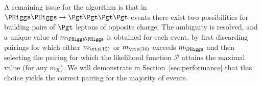 A remaining issue for the algorithm is that in $\PHiggs\PHiggs \to \Pgt\Pgt\Pgt\Pgt$ events 
there exist two possibilities for building pairs of $\Pgt$ leptons of opposite charge.
The ambiguity is resolved, and a unique value of $m_{\PHiggs\PHiggs}$ is obtained for each event, 
by first discarding pairings for which either $m_{\vis(12)}$ or $m_{\vis(34)}$ exceeds $m_{\PHiggs}$
and then selecting the pairing for which the likelihood function $\mathcal{P}$
attains the maximal value (for any $m_{\textrm{X}}$).
We will demonstrate in Section~\ref{sec:performance} that this choice yields the correct pairing for the majority of events.





